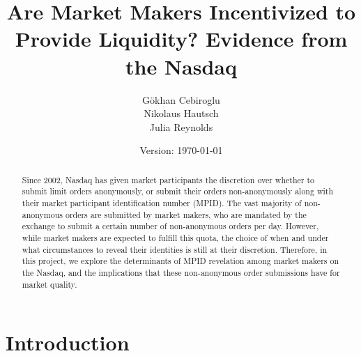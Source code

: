 \documentclass{article}
\begin{document}
\setlength{\parskip}{15pt}

\title{Are Market Makers Incentivized to Provide Liquidity? Evidence from the Nasdaq}
\author{G\"{o}khan Cebiroglu \\ Nikolaus Hautsch \\ Julia Reynolds}
\date{Version: \today}
\maketitle

\begin{abstract}
\noindent Since 2002, Nasdaq has given market participants the discretion over whether to submit limit orders anonymously, or submit their orders non-anonymously along with their market participant identification number (MPID). The vast majority of non-anonymous orders are submitted by market makers, who are mandated by the exchange to submit a certain number of non-anonymous orders per day. However, while market makers are expected to fulfill this quota, the choice of when and under what circumstances to reveal their identities is still at their discretion. Therefore, in this project, we explore the determinants of MPID revelation among market makers on the Nasdaq, and the implications that these non-anonymous order submissions have for market quality.
\end{abstract}

\clearpage 

\section{Introduction}
\end{document}
